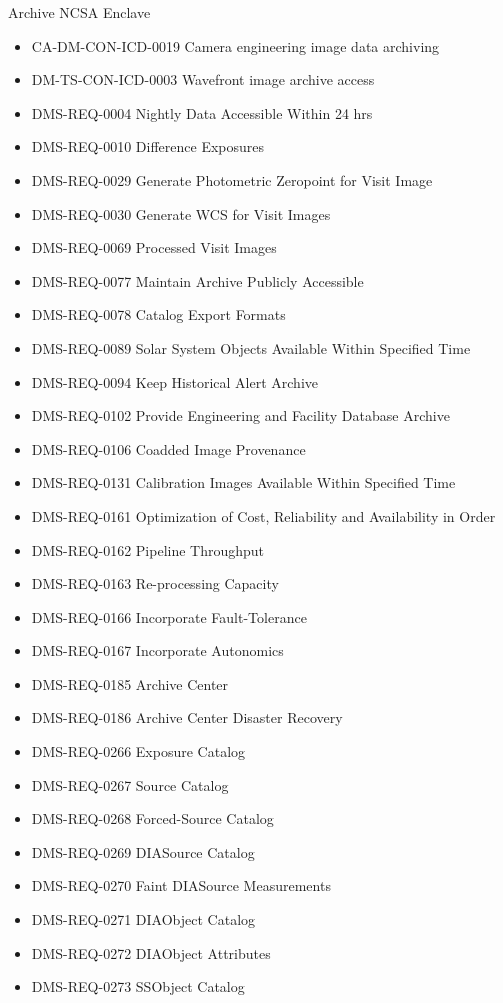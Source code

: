 Archive NCSA Enclave \begin{itemize}
\item CA-DM-CON-ICD-0019 Camera engineering image data archiving
\item DM-TS-CON-ICD-0003 Wavefront image archive access
\item DMS-REQ-0004 Nightly Data Accessible Within 24 hrs
\item DMS-REQ-0010 Difference Exposures
\item DMS-REQ-0029 Generate Photometric Zeropoint for Visit Image
\item DMS-REQ-0030 Generate WCS for Visit Images
\item DMS-REQ-0069 Processed Visit Images
\item DMS-REQ-0077 Maintain Archive Publicly Accessible
\item DMS-REQ-0078 Catalog Export Formats
\item DMS-REQ-0089 Solar System Objects Available Within Specified Time
\item DMS-REQ-0094 Keep Historical Alert Archive
\item DMS-REQ-0102 Provide Engineering and Facility Database Archive
\item DMS-REQ-0106 Coadded Image Provenance
\item DMS-REQ-0131 Calibration Images Available Within Specified Time
\item DMS-REQ-0161 Optimization of Cost, Reliability and Availability in Order
\item DMS-REQ-0162 Pipeline Throughput
\item DMS-REQ-0163 Re-processing Capacity
\item DMS-REQ-0166 Incorporate Fault-Tolerance
\item DMS-REQ-0167 Incorporate Autonomics
\item DMS-REQ-0185 Archive Center
\item DMS-REQ-0186 Archive Center Disaster Recovery
\item DMS-REQ-0266 Exposure Catalog
\item DMS-REQ-0267 Source Catalog
\item DMS-REQ-0268 Forced-Source Catalog
\item DMS-REQ-0269 DIASource Catalog
\item DMS-REQ-0270 Faint DIASource Measurements
\item DMS-REQ-0271 DIAObject Catalog
\item DMS-REQ-0272 DIAObject Attributes
\item DMS-REQ-0273 SSObject Catalog

\end{itemize}
